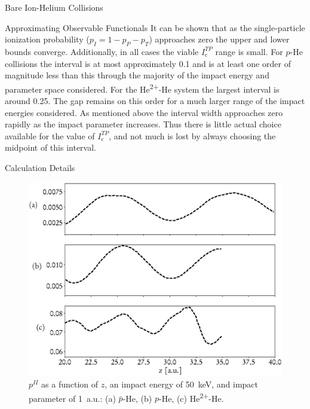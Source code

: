 \documentclass[a5paper, 9 pt]{extreport}
\begin{document}
\begin{chapter}{Bare Ion-Helium Collisions \label{chap:p-he2p-he}}
\begin{section}{Approximating Observable Functionals \label{sec:phe2p-obs}}
      It can be shown that as the single-particle ionization probability ($p_I = 1 - p_P - p_T$)
      approaches zero the upper and lower bounds converge. Additionally, in all cases the viable
      $I_\mathrm{c}^{TP}$ range is small. For $p$-He collisions the interval is at most approximately
      0.1 and is at least one order of magnitude less than this through the majority of the impact
      energy and parameter space considered. For the He\textsuperscript{2+}-He system the largest
      interval is around 0.25. The gap remains on this order for a much larger range of the impact
      energies considered. As mentioned above the interval width approaches zero rapidly as the impact
      parameter increases. Thus there is little actual choice available for the value of
      $I_\mathrm{c}^{TP}$, and not much is lost by always choosing the midpoint of this interval.

   \end{section}

   \begin{section}{Calculation Details \label{sec:phe2p-det}}

      \begin{figure}[t]
         \begin{minipage}{.49\linewidth}

            \centering
            \includegraphics[width = \linewidth]{./images/poz.eps}
            \caption[Probabilities as a function of nuclear separation.]{$p^{II}$ as a
                     function of $z$, an impact energy of 50~keV, and impact parameter of 1~a.u.:
                     (a) $\bar{p}$-He, (b) $p$-He, (c) He\textsuperscript{2+}-He. \label{fig:poz}}
         \end{minipage} \hspace{0.009\linewidth} %
         \begin{minipage}{.49\linewidth}


\end{minipage}
\end{figure}
\end{section}
\end{chapter}
\end{document}
